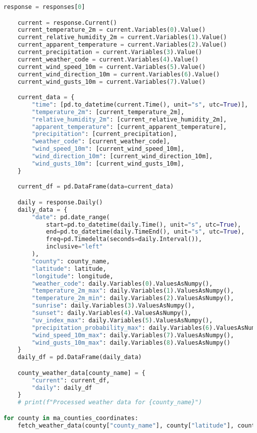 \documentclass[a4paper, 12pt]{article}
\begin{document}
\begin{lstlisting}[language=Python, caption=Web Server code]
    response = responses[0]

    current = response.Current()
    current_temperature_2m = current.Variables(0).Value()
    current_relative_humidity_2m = current.Variables(1).Value()
    current_apparent_temperature = current.Variables(2).Value()
    current_precipitation = current.Variables(3).Value()
    current_weather_code = current.Variables(4).Value()
    current_wind_speed_10m = current.Variables(5).Value()
    current_wind_direction_10m = current.Variables(6).Value()
    current_wind_gusts_10m = current.Variables(7).Value()

    current_data = {
        "time": [pd.to_datetime(current.Time(), unit="s", utc=True)],
        "temperature_2m": [current_temperature_2m],
        "relative_humidity_2m": [current_relative_humidity_2m],
        "apparent_temperature": [current_apparent_temperature],
        "precipitation": [current_precipitation],
        "weather_code": [current_weather_code],
        "wind_speed_10m": [current_wind_speed_10m],
        "wind_direction_10m": [current_wind_direction_10m],
        "wind_gusts_10m": [current_wind_gusts_10m],
    }

    current_df = pd.DataFrame(data=current_data)

    daily = response.Daily()
    daily_data = {
        "date": pd.date_range(
            start=pd.to_datetime(daily.Time(), unit="s", utc=True),
            end=pd.to_datetime(daily.TimeEnd(), unit="s", utc=True),
            freq=pd.Timedelta(seconds=daily.Interval()),
            inclusive="left"
        ),
        "county": county_name,
        "latitude": latitude,
        "longitude": longitude,
        "weather_code": daily.Variables(0).ValuesAsNumpy(),
        "temperature_2m_max": daily.Variables(1).ValuesAsNumpy(),
        "temperature_2m_min": daily.Variables(2).ValuesAsNumpy(),
        "sunrise": daily.Variables(3).ValuesAsNumpy(),
        "sunset": daily.Variables(4).ValuesAsNumpy(),
        "uv_index_max": daily.Variables(5).ValuesAsNumpy(),
        "precipitation_probability_max": daily.Variables(6).ValuesAsNumpy(),
        "wind_speed_10m_max": daily.Variables(7).ValuesAsNumpy(),
        "wind_gusts_10m_max": daily.Variables(8).ValuesAsNumpy()
    }
    daily_df = pd.DataFrame(daily_data)

    county_weather_data[county_name] = {
        "current": current_df,
        "daily": daily_df
    }
    # print(f"Processed weather data for {county_name}")

for county in ma_counties_coordinates:
    fetch_weather_data(county["county_name"], county["latitude"], county["longitude"])


\end{lstlisting}
\end{document}
